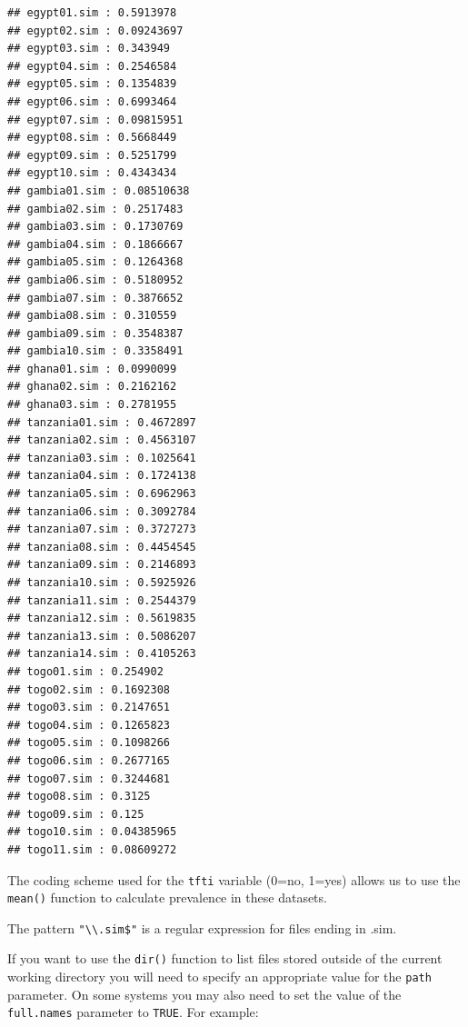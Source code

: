 \documentclass[12pt,a4paper]{book}
\newenvironment{Shaded}{\begin{snugshade}}{\end{snugshade}}
\newcommand{\KeywordTok}[1]{\textcolor[rgb]{0.13,0.29,0.53}{\textbf{#1}}}
\newcommand{\DataTypeTok}[1]{\textcolor[rgb]{0.13,0.29,0.53}{#1}}
\newcommand{\CharTok}[1]{\textcolor[rgb]{0.31,0.60,0.02}{#1}}
\newcommand{\StringTok}[1]{\textcolor[rgb]{0.31,0.60,0.02}{#1}}
\newcommand{\OtherTok}[1]{\textcolor[rgb]{0.56,0.35,0.01}{#1}}
\newcommand{\ControlFlowTok}[1]{\textcolor[rgb]{0.13,0.29,0.53}{\textbf{#1}}}
\newcommand{\OperatorTok}[1]{\textcolor[rgb]{0.81,0.36,0.00}{\textbf{#1}}}
\newcommand{\NormalTok}[1]{#1}
\theoremstyle{definition}
\theoremstyle{definition}
\theoremstyle{definition}
\theoremstyle{remark}
\begin{document}
\begin{verbatim}
## egypt01.sim : 0.5913978 
## egypt02.sim : 0.09243697 
## egypt03.sim : 0.343949 
## egypt04.sim : 0.2546584 
## egypt05.sim : 0.1354839 
## egypt06.sim : 0.6993464 
## egypt07.sim : 0.09815951 
## egypt08.sim : 0.5668449 
## egypt09.sim : 0.5251799 
## egypt10.sim : 0.4343434 
## gambia01.sim : 0.08510638 
## gambia02.sim : 0.2517483 
## gambia03.sim : 0.1730769 
## gambia04.sim : 0.1866667 
## gambia05.sim : 0.1264368 
## gambia06.sim : 0.5180952 
## gambia07.sim : 0.3876652 
## gambia08.sim : 0.310559 
## gambia09.sim : 0.3548387 
## gambia10.sim : 0.3358491 
## ghana01.sim : 0.0990099 
## ghana02.sim : 0.2162162 
## ghana03.sim : 0.2781955 
## tanzania01.sim : 0.4672897 
## tanzania02.sim : 0.4563107 
## tanzania03.sim : 0.1025641 
## tanzania04.sim : 0.1724138 
## tanzania05.sim : 0.6962963 
## tanzania06.sim : 0.3092784 
## tanzania07.sim : 0.3727273 
## tanzania08.sim : 0.4454545 
## tanzania09.sim : 0.2146893 
## tanzania10.sim : 0.5925926 
## tanzania11.sim : 0.2544379 
## tanzania12.sim : 0.5619835 
## tanzania13.sim : 0.5086207 
## tanzania14.sim : 0.4105263 
## togo01.sim : 0.254902 
## togo02.sim : 0.1692308 
## togo03.sim : 0.2147651 
## togo04.sim : 0.1265823 
## togo05.sim : 0.1098266 
## togo06.sim : 0.2677165 
## togo07.sim : 0.3244681 
## togo08.sim : 0.3125 
## togo09.sim : 0.125 
## togo10.sim : 0.04385965 
## togo11.sim : 0.08609272
\end{verbatim}

The coding scheme used for the \texttt{tfti} variable (0=no, 1=yes)
allows us to use the \texttt{mean()} function to calculate prevalence in
these datasets.

The pattern \texttt{"\textbackslash{}\textbackslash{}.sim\$"} is a
regular expression for files ending in .sim.

If you want to use the \texttt{dir()} function to list files stored
outside of the current working directory you will need to specify an
appropriate value for the \texttt{path} parameter. On some systems you
may also need to set the value of the \texttt{full.names} parameter to
\texttt{TRUE}. For example:

\begin{Shaded}
\end{Shaded}
\end{document}
